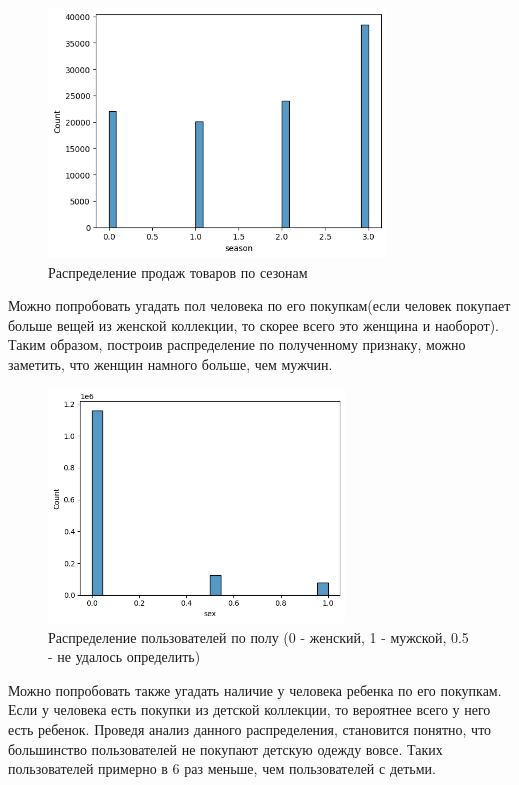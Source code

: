 \documentclass[bachelor, och, coursework]{SCWorks}
\begin{document}
\begin{figure}[H]
    \centering
    \includegraphics[width=0.8\textwidth]{pic/10}
    \caption{Распределение продаж товаров по сезонам}
    \label{fig:img1}
\end{figure}

Можно попробовать угадать пол человека по его покупкам(если человек покупает больше вещей из женской коллекции, то скорее всего это женщина и наоборот). Таким образом, построив распределение по полученному признаку, можно заметить, что женщин намного больше, чем мужчин.

\begin{figure}[H]
    \centering
    \includegraphics[width=0.7\textwidth]{pic/11}
    \caption{Распределение пользователей по полу (0 - женский, 1 - мужской, 0.5 - не удалось определить)}
    \label{fig:img1}
\end{figure}

Можно попробовать также угадать наличие у человека ребенка по его покупкам. Если у человека есть покупки из детской коллекции, то вероятнее всего у него есть ребенок. Проведя анализ данного распределения, становится понятно, что большинство пользователей не покупают детскую одежду вовсе. Таких пользователей примерно в 6 раз меньше, чем пользователей с детьми.
\end{document}
